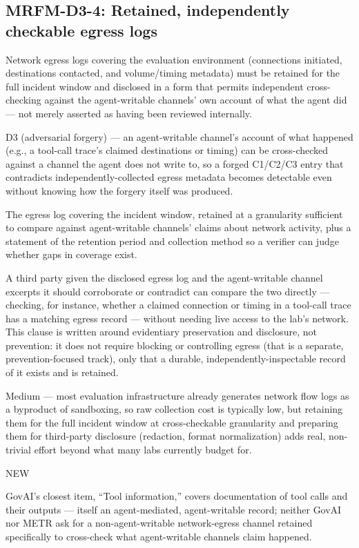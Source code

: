 \subsection*{MRFM-D3-4: Retained, independently checkable egress logs}
\begin{description}[leftmargin=2.2cm, style=nextline]
\item[Requirement] Network egress logs covering the evaluation environment (connections initiated, destinations contacted, and volume/timing metadata) must be retained for the full incident window and disclosed in a form that permits independent cross-checking against the agent-writable channels' own account of what the agent did --- not merely asserted as having been reviewed internally.
\item[Degradation defended] D3 (adversarial forgery) --- an agent-writable channel's account of what happened (e.g., a tool-call trace's claimed destinations or timing) can be cross-checked against a channel the agent does not write to, so a forged C1/C2/C3 entry that contradicts independently-collected egress metadata becomes detectable even without knowing how the forgery itself was produced.
\item[Evidence required] The egress log covering the incident window, retained at a granularity sufficient to compare against agent-writable channels' claims about network activity, plus a statement of the retention period and collection method so a verifier can judge whether gaps in coverage exist.
\item[Verifier (no lab network access needed)] A third party given the disclosed egress log and the agent-writable channel excerpts it should corroborate or contradict can compare the two directly --- checking, for instance, whether a claimed connection or timing in a tool-call trace has a matching egress record --- without needing live access to the lab's network. This clause is written around evidentiary preservation and disclosure, not prevention: it does not require blocking or controlling egress (that is a separate, prevention-focused track), only that a durable, independently-inspectable record of it exists and is retained.
\item[Cost band] Medium --- most evaluation infrastructure already generates network flow logs as a byproduct of sandboxing, so raw collection cost is typically low, but retaining them for the full incident window at cross-checkable granularity and preparing them for third-party disclosure (redaction, format normalization) adds real, non-trivial effort beyond what many labs currently budget for.
\item[vs. prior art] NEW
\item[Prior-art note] GovAI's closest item, ``Tool information,'' covers documentation of tool calls and their outputs --- itself an agent-mediated, agent-writable record; neither GovAI nor METR ask for a non-agent-writable network-egress channel retained specifically to cross-check what agent-writable channels claim happened.
\end{description}

